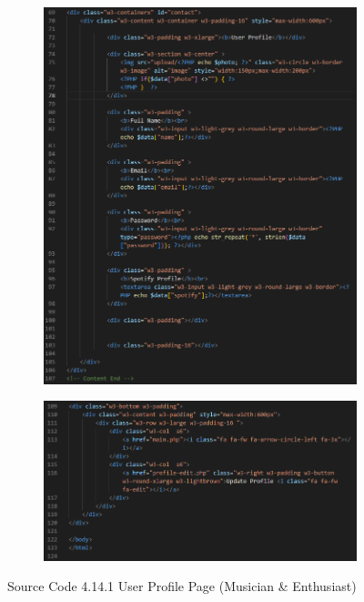 \begin{enumerate}[1.]
\begin{figure}[h]
\begin{subfigure}[b]{0.7\textwidth}
            \includegraphics[width=\textwidth]{mainmatter/images/frontend/code/userprofile.png}
            \label{fig:sub1}
        \end{subfigure}
        \hspace{0.05\textwidth}
        \begin{subfigure}[b]{0.7\textwidth}
            \centering
            \includegraphics[width=\textwidth]{mainmatter/images/frontend/code/userprofile2.png}
            \label{fig:sub2}
        \end{subfigure}
        \caption*{Source Code 4.14.1 User Profile Page (Musician \& Enthusiast)}
        \label{fig:myfig53a}
    \end{figure}


\end{enumerate}
